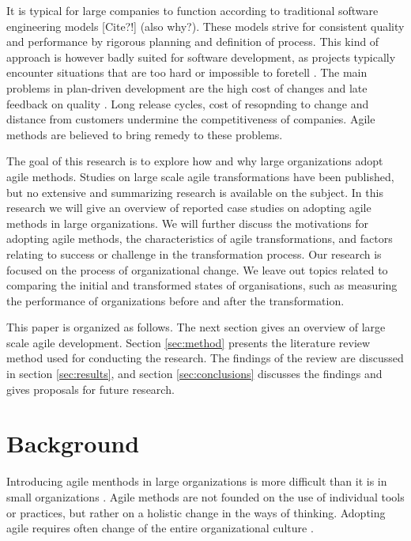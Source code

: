 \documentclass[lnbip]{svmultln}
\begin{document}
It is typical for large companies to function according to traditional software
engineering models [Cite?!] (also why?). These models strive for consistent quality and performance
by rigorous planning and definition of process. This kind of approach is however
badly suited for software development, as projects typically encounter
situations that are too hard or impossible to foretell \cite{Schwaber2002}.
The main problems in plan-driven development are the high cost of changes and
late feedback on quality \cite{Petersen2010}. Long release cycles, cost of
resopnding to change and distance from customers undermine the  competitiveness
of companies. Agile methods are believed to bring remedy to these problems.

The goal of this research is to explore how and why large organizations adopt
agile methods. Studies on large scale agile transformations have been published,
but no extensive and summarizing research is available on the subject. In this
research we will give an overview of reported case studies on adopting agile
methods in large organizations. We will further discuss the motivations for
adopting agile methods, the characteristics of agile transformations, and
factors relating to success or challenge in the transformation process. Our
research is focused on the process of organizational change. We leave out topics
related to comparing the initial and transformed states of organisations, such
as measuring the performance of organizations before and after the
transformation.

This paper is organized as follows. The next section gives an overview of large
scale agile development. Section \ref{sec:method} presents the literature review
method used for conducting the research. The findings of the review are
discussed in section \ref{sec:results}, and section \ref{sec:conclusions}
discusses the findings and gives proposals for future research.


\section{Background}
\label{sec:background}

Introducing agile menthods in large organizations is more difficult than it is
in small organizations \cite{Livermore2008, Dyba2008}. Agile methods are not
founded on the use of individual tools or practices, but rather on a holistic
change in the ways of thinking. Adopting agile requires often change of the
entire organizational culture \cite{Misra2010}.
\end{document}
